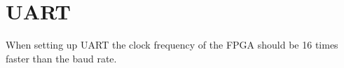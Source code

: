 \section{UART}


When setting up UART the clock frequency of the FPGA should be 16 times faster
than the baud rate.
